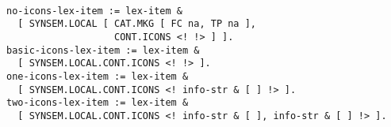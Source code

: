 \documentclass[a4paper]{article}
\begin{document}
{\small\begin{verbatim}

no-icons-lex-item := lex-item & 
  [ SYNSEM.LOCAL [ CAT.MKG [ FC na, TP na ],
                   CONT.ICONS <! !> ] ].
basic-icons-lex-item := lex-item &
  [ SYNSEM.LOCAL.CONT.ICONS <! !> ].
one-icons-lex-item := lex-item &
  [ SYNSEM.LOCAL.CONT.ICONS <! info-str & [ ] !> ].
two-icons-lex-item := lex-item &
  [ SYNSEM.LOCAL.CONT.ICONS <! info-str & [ ], info-str & [ ] !> ].
\end{verbatim}}
\end{document}
